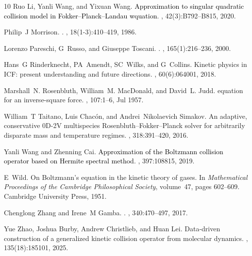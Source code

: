 \documentclass[preprint,1p,times]{elsarticle}
\theoremstyle{definition}
\theoremstyle{remark}
\newcommand{\tcr}[1]{\textcolor{black}{#1}}
\begin{document}
\begin{thebibliography}{10}
Ruo Li, Yanli Wang, and Yixuan Wang.
\newblock \tcr{Approximation to singular quadratic collision model in
  {F}okker--{P}lanck--{L}andau wquation}.
, 42(3):B792--B815, 2020.

Philip~J Morrison.
.
, 18(1-3):410--419, 1986.

Lorenzo Pareschi, G~Russo, and Giuseppe Toscani.
.
, 165(1):216--236, 2000.

Hans~G Rinderknecht, PA~Amendt, SC~Wilks, and G~Collins.
\newblock Kinetic physics in {ICF}: present understanding and future
  directions.
, 60(6):064001, 2018.

Marshall~N. Rosenbluth, William~M. MacDonald, and David~L. Judd.
 equation for an inverse-square force.
, 107:1--6, Jul 1957.

William~T Taitano, Luis Chac{\'o}n, and Andrei~Nikolaevich Simakov.
\newblock An adaptive, conservative {0D-2V} multispecies
  {Rosenbluth--Fokker--Planck} solver for arbitrarily disparate mass and
  temperature regimes.
, 318:391--420, 2016.

Yanli Wang and Zhenning Cai.
\newblock \tcr{Approximation of the Boltzmann collision operator based on
  Hermite spectral method}.
, 397:108815, 2019.

E~Wild.
\newblock On {B}oltzmann's equation in the kinetic theory of gases.
\newblock In {\em Mathematical Proceedings of the Cambridge Philosophical
  Society}, volume~47, pages 602--609. Cambridge University Press, 1951.

Chenglong Zhang and Irene~M Gamba.
.
, 340:470--497, 2017.

Yue Zhao, Joshua Burby, Andrew Christlieb, and Huan Lei.
\newblock Data-driven construction of a generalized kinetic collision operator
  from molecular dynamics.
, 135(18):185101, 2025.

\end{thebibliography}





\end{document}
